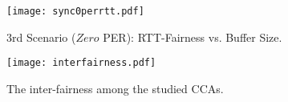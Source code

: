 \documentclass[preprint,3p,times,twocolumn,authoryear]{elsarticle}
\begin{document}
\begin{figure}[h!]
\centering
\texttt{[image: sync0perrtt.pdf]}
\caption{3rd Scenario ($Zero$ PER): RTT-Fairness vs. Buffer Size.}
\label{fig:sync0perrtt}
\end{figure}

\begin{figure}[h!]
\centering
\texttt{[image: interfairness.pdf]}
\caption{The inter-fairness among the studied CCAs.}
\label{fig:interfairness}
\end{figure}
\end{document}
